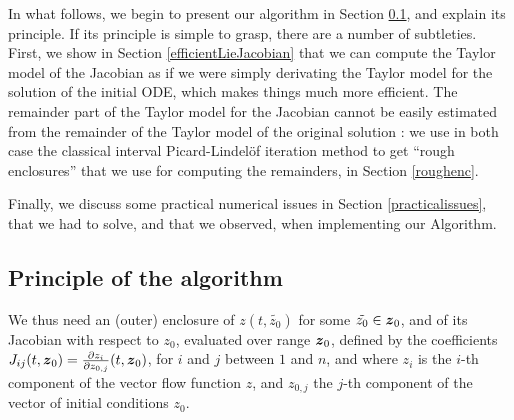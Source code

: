 \documentclass{sig-alternate-05-2015} %
\begin{document}
In what follows, we begin to present our algorithm in Section
\ref{principle}, and explain its principle. 
If its principle is simple to grasp, there are a number of subtleties. 
First, we show in Section \ref{efficientLieJacobian} that we can compute
the Taylor model of the Jacobian as if we were simply derivating the Taylor model 
for the solution of the initial ODE, which makes things much more efficient. 
The remainder part of the Taylor model for the Jacobian cannot be easily estimated
from the remainder of the Taylor model of the original solution : we use in both
case the classical interval Picard-Lindel\"of iteration method to get ``rough
enclosures'' that we use for computing the remainders, in Section \ref{roughenc}.

Finally, we discuss some practical numerical issues in Section \ref{practicalissues}, 
that we had to solve, and that we observed, when implementing our Algorithm. 

\subsection{Principle of the algorithm}

\label{principle}

We thus need an (outer) enclosure of $z(t,\tilde{z_0})$ for some $\tilde{z_0} \in \z_0$, and of its Jacobian with respect to $z_0$, evaluated over range $\z_0$, 
defined by the coefficients $J_{ij}(t,\z_0)=\frac{\partial z_i}{\partial z_{0,j}}(t,\z_0)$, for $i$ and $j$ between $1$ and $n$, and where $z_i$ is the $i$-th 
component of the vector flow function $z$, and $z_{0,j}$ the $j$-th component of the vector of initial conditions $z_0$. 
\end{document}
